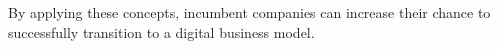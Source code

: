 \documentclass[a4]{scrartcl}
\begin{document}
By applying these concepts, incumbent companies can increase their chance to successfully transition to a digital business model.










	
\newpage
{}
\begin{spacing}{0.9}
	\printbibliography
\end{spacing}


	
	
	
	
	
	
\end{document}
